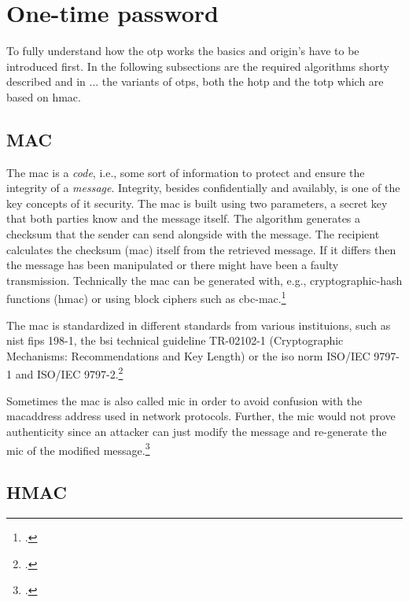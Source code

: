 \section{One-time password}

To fully understand how the \gls{otp} works the basics and origin's have to be introduced first. In the following subsections are the required algorithms shorty described and in ... the variants of \glspl{otp}, both the \gls{hotp} and the \gls{totp} which are based on \gls{hmac}.

\subsection{MAC}

The \gls{mac} is a \textit{code}, i.e., some sort of information to protect and ensure the integrity of a \textit{message}. Integrity, besides confidentially and availably, is one of the key concepts of \gls{it} security. The \gls{mac} is built using two parameters, a secret key that both parties know and the message itself. The algorithm generates a checksum that the sender can send alongside with the message. The recipient calculates the checksum (\gls{mac}) itself from the retrieved message. If it differs then the message has been manipulated or there might have been a faulty transmission. Technically the \gls{mac} can be generated with, e.g., cryptographic-hash functions (\gls{hmac}) or using block ciphers such as \gls{cbc-mac}.\footcites[See][565]{320284}[See][163--168]{anderson2008security}


The \gls{mac} is standardized in different standards from various instituions, such as \gls{nist} \gls{fips} 198-1, the \gls{bsi} technical guideline TR-02102-1 (\frqq Cryptographic Mechanisms: Recommendations and Key Length\flqq{}) or the \gls{iso} norm ISO/IEC 9797-1 and ISO/IEC 9797-2.\footcites[See][]{FIPS198}[See][]{bsi2019recommendations}[See][]{iso9797-1}[See][]{iso9797-2}

Sometimes the \gls{mac} is also called \gls{mic} in order to avoid confusion with the \gls{macaddress} address used in network protocols. Further, the \gls{mic} would not prove authenticity since an attacker can just modify the message and re-generate the \gls{mic} of the modified message.\footcites[See][60-62]{265831}

\subsection{HMAC}

